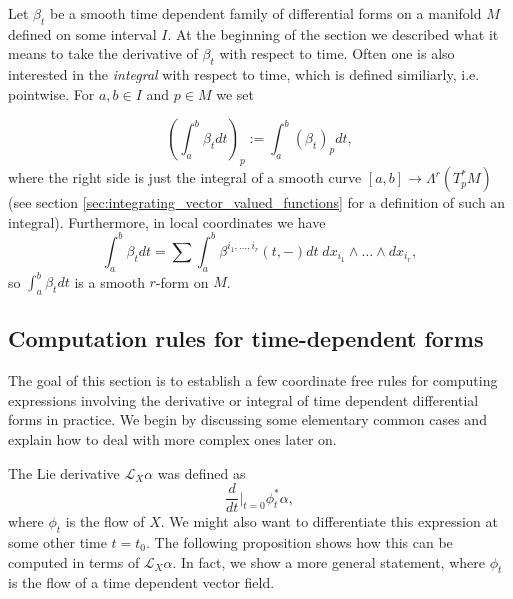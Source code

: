 Let $\beta_t$ be a smooth time dependent family of differential forms on a manifold $M$ defined on some interval $I$. At the beginning of the section we described what it means to take the derivative of $\beta_t$ with respect to time. Often one is also interested in the \textit{integral} with respect to time, which is defined similiarly, i.e. pointwise. For $a ,b \in I$ and $p \in M$ we set

\[
\left( \int_{a}^{b} \beta_t dt \right)_p := \int_{a}^{b} (\beta_t)_p dt,
\]
where the right side is just the integral of a smooth curve $[a,b] \to \Lambda^r(T_p^\ast M)$ (see section \ref{sec:integrating_vector_valued_functions} for a definition of such an integral). Furthermore, in local coordinates we have
\[
    \int_{a}^{b} \beta_t dt = \sum \int_{a}^{b} \beta^{i_1,\ldots,i_r}(t,-) dt \; dx_{i_1} \wedge \ldots \wedge dx_{i_r},
\]
so $\int_{a}^{b} \beta_t dt$ is a smooth $r$-form on $M$.


\subsection{Computation rules for time-dependent forms}
The goal of this section is to establish a few coordinate free rules for computing expressions involving the derivative or integral of time dependent differential forms in practice. We begin by discussing some elementary common cases and explain how to deal with more complex ones later on. 

\vspace{.25cm}

\noindent The Lie derivative $\mathcal{L}_X\alpha$ was defined as
\[
\frac{d}{dt}\bigg|_{t=0}\phi_t^\ast\alpha,
\]
where $\phi_t$ is the flow of $X$. We might also want to differentiate this expression at some other time $t=t_0$. The following proposition shows how this can be computed in terms of $\mathcal{L}_X\alpha$. In fact, we show a more general statement, where $\phi_t$ is the flow of a time dependent vector field.

